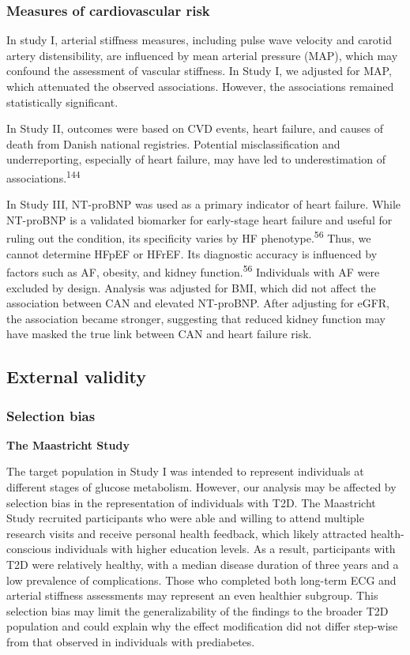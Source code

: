 \documentclass[
  letterpaper,
  headsepline=true,
  open=any]{scrbook}
\begin{document}
\hypertarget{measures-of-cardiovascular-risk}{%
\subsubsection{Measures of cardiovascular
risk}\label{measures-of-cardiovascular-risk}}

In study I, arterial stiffness measures, including pulse wave velocity
and carotid artery distensibility, are influenced by mean arterial
pressure (MAP), which may confound the assessment of vascular stiffness.
In Study I, we adjusted for MAP, which attenuated the observed
associations. However, the associations remained statistically
significant.

In Study II, outcomes were based on CVD events, heart failure, and
causes of death from Danish national registries. Potential
misclassification and underreporting, especially of heart failure, may
have led to underestimation of associations.\textsuperscript{144}

In Study III, NT-proBNP was used as a primary indicator of heart
failure. While NT-proBNP is a validated biomarker for early-stage heart
failure and useful for ruling out the condition, its specificity varies
by HF phenotype.\textsuperscript{56} Thus, we cannot determine HFpEF or
HFrEF. Its diagnostic accuracy is influenced by factors such as AF,
obesity, and kidney function.\textsuperscript{56} Individuals with AF
were excluded by design. Analysis was adjusted for BMI, which did not
affect the association between CAN and elevated NT-proBNP. After
adjusting for eGFR, the association became stronger, suggesting that
reduced kidney function may have masked the true link between CAN and
heart failure risk.

\hypertarget{external-validity}{%
\subsection{External validity}\label{external-validity}}

\hypertarget{selection-bias}{%
\subsubsection{Selection bias}\label{selection-bias}}

\textbf{The Maastricht Study}

The target population in Study I was intended to represent individuals
at different stages of glucose metabolism. However, our analysis may be
affected by selection bias in the representation of individuals with
T2D. The Maastricht Study recruited participants who were able and
willing to attend multiple research visits and receive personal health
feedback, which likely attracted health-conscious individuals with
higher education levels. As a result, participants with T2D were
relatively healthy, with a median disease duration of three years and a
low prevalence of complications. Those who completed both long-term ECG
and arterial stiffness assessments may represent an even healthier
subgroup. This selection bias may limit the generalizability of the
findings to the broader T2D population and could explain why the effect
modification did not differ step-wise from that observed in individuals
with prediabetes.
\end{document}
